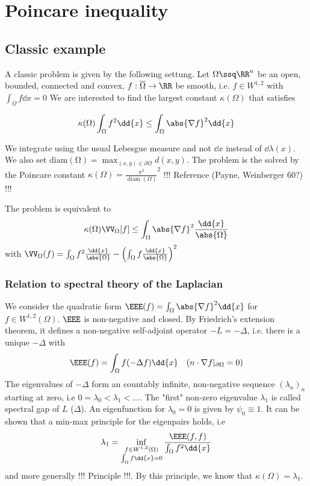 \section{Poincare inequality}

\subsection{Classic example}
A classic problem is given by the following settung. Let $\Omega\ssq \RR^n$ be an open, bounded, connected and convex, $f:\overline{\Omega}\to \RR$ be smooth, i.e. $f\in W^{1,2}$ with $\int_\Omega f \dd{x}=0$
We are interested to find the largest constant $\kappa(\Omega)$ that satisfies

$$\kappa(\Omega) \int_\Omega f^2 \dd{x} \leq \int_\Omega \abs{\nabla f}^2 \dd{x}$$

We integrate using the usual Lebesgue measure and not $\dd{x}$ instead of $\dd{\lambda(x)}$. We also set $\operatorname{diam(\Omega)} = \max_{(x,y)\in \partial \Omega} d(x,y)$. The problem is the solved by the Poincare constant $\kappa(\Omega)=\frac{\pi^2}{\operatorname{diam}(\Omega)}^2$ !!! Reference (Payne, Weinberger 60?) !!!

The problem is equivalent to 
$$\kappa(\Omega) \VV_\Omega[f] \leq \int_\Omega \abs{\nabla f}^2 \frac{\dd{x}}{\abs{\Omega}}$$
with $\VV_\Omega(f)=\int_\Omega f^2 \frac{\dd{x}}{\abs{\Omega}} - \left(\int_\Omega f \frac{\dd{x}}{\abs{\Omega}}\right)^2$


\subsubsection{Relation to spectral theory of the Laplacian}


We consider the quadratic form $\EEE(f)= \int_\Omega \abs{\nabla f}^2 \dd{x}$ for $f\in W^{1,2}(\Omega)$. $\EEE$ is non-negative and closed. By Friedrich's extension theorem, it defines a non-negative self-adjoint operator $-L=-\Delta$, i.e. there is a unique $-\Delta$ with 
$$\EEE(f) = \int_\Omega f(-\Delta f) \dd{x} \quad (n\cdot \nabla f\vert_{\partial \Omega}=0)$$
The eigenvalues of $-\Delta$ form an countably infinite, non-negative sequence $(\lambda_n)_n$ starting at zero, i.e $0=\lambda_0<\lambda_1<\dots$.
The "first" non-zero eigenvalue $\lambda_1$ is called spectral gap of $L$ ($\Delta$). An eigenfunction for $\lambda_0=0$ is given by $\psi_0\equiv 1$. It can be shown that a min-max principle for the eigenpairs holds, i.e
$$\lambda_1 = \inf_{\substack{f\in W^{1,2}(\Omega) \\ \int_\Omega f \dd{x}=0}} \frac{\EEE(f,f)}{\int_\Omega f^2 \dd{x}}$$
and more generally !!! Principle !!!. By this principle, we know that $\kappa(\Omega)=\lambda_1$. 


